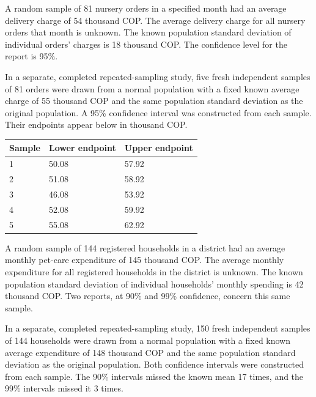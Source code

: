 \noindent\begin{minipage}[t]{0.60\linewidth}
\vspace{0pt}
A random sample of 81 nursery orders in a specified month had an average delivery charge of 54 thousand COP. The average delivery charge for all nursery orders that month is unknown. The known population standard deviation of individual orders' charges is 18 thousand COP. The confidence level for the report is 95\%.

In a separate, completed repeated-sampling study, five fresh independent samples of 81 orders were drawn from a normal population with a fixed known average charge of 55 thousand COP and the same population standard deviation as the original population. A 95\% confidence interval was constructed from each sample. Their endpoints appear below in thousand COP.
\end{minipage}\hfill
\begin{minipage}[t]{0.38\linewidth}
\vspace{0pt}
\centering
\small
\setlength{\tabcolsep}{4pt}
\begin{tabular}{@{}lll@{}}\toprule
Sample & Lower endpoint & Upper endpoint\\\midrule
1 & 50.08 & 57.92\\
2 & 51.08 & 58.92\\
3 & 46.08 & 53.92\\
4 & 52.08 & 59.92\\
5 & 55.08 & 62.92\\
\bottomrule\end{tabular}
\end{minipage}\par

A random sample of 144 registered households in a district had an average monthly pet-care expenditure of 145 thousand COP. The average monthly expenditure for all registered households in the district is unknown. The known population standard deviation of individual households' monthly spending is 42 thousand COP. Two reports, at 90\% and 99\% confidence, concern this same sample.

In a separate, completed repeated-sampling study, 150 fresh independent samples of 144 households were drawn from a normal population with a fixed known average expenditure of 148 thousand COP and the same population standard deviation as the original population. Both confidence intervals were constructed from each sample. The 90\% intervals missed the known mean 17 times, and the 99\% intervals missed it 3 times.

